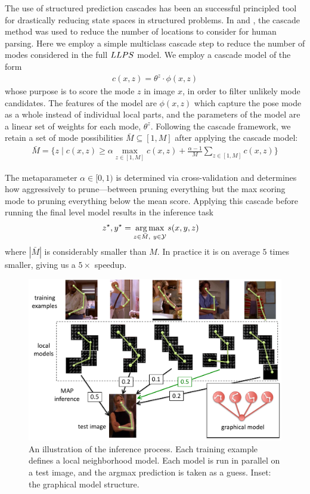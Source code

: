 The use of structured prediction cascades has been an successful principled 
tool for drastically reducing state spaces in structured problems.  In 
 and , the cascade method was used to reduce
the number of locations to consider for human parsing.  Here we employ a simple 
multiclass cascade step to reduce the number of modes considered in the full 
$LLPS$ model. We employ a cascade model of the form \begin{align}
c(x,z) = \theta^z \cdot \phi(x,z)
\end{align}
whose purpose is to score the mode $z$ in image $x$, in order to filter 
unlikely mode candidates.  The features of the model are $\phi(x,z)$ which 
capture the pose mode as a whole instead of individual local parts, and the 
parameters of the model are a linear set of weights for each mode, $\theta^z$.  
Following the cascade framework, we retain a set of mode possibilities $\bar{M} 
\subseteq [1,M]$ after applying the cascade model:
\begin{align}
\bar{M} = \{ z \;|\; c(x,z) \geq \alpha \max_{z \in [1,M]} c(x,z) + 
\frac{\alpha-1}{M} \sum_{z \in [1,M]} c(x,z) \}
\end{align}

The metaparameter $\alpha \in [0,1)$ is determined via cross-validation and 
determines how aggressively to prune---between pruning everything but the max 
scoring mode to pruning everything below the mean score.  Applying this cascade 
before running the final level \LLPS model results in the inference task
\begin{align}
z^\star,y^\star &= \mathop{\arg\max}_{z \in \bar{M},~y \in \mathcal{Y}} s(x,y,z) 
\end{align}
where $|\bar{M}|$ is considerably smaller than $M$.  In practice it is on 
average $5$ times smaller, giving us a $5\times$ speedup.

\begin{figure}[tb!]
\centering
\includegraphics[width=0.99\linewidth]{figs/llps-inference.pdf}
\caption[LLPS inference.]{\label{fig:llps-inference} An illustration of the 
inference process.  Each training example defines a local neighborhood model.  
Each model is run in parallel on a test image, and the argmax prediction is 
taken as a guess. Inset: the graphical model structure.}
\end{figure}

